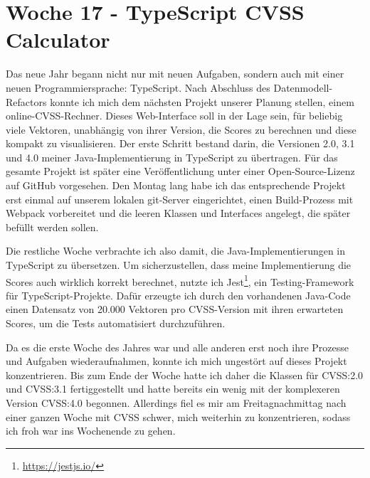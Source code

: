 \section{Woche 17 - TypeScript CVSS Calculator} \label{sec:bericht-wo-17-initial}


\lweekdaymarginpar{\weekdayMondayLong}

Das neue Jahr begann nicht nur mit neuen Aufgaben, sondern auch mit einer neuen Programmiersprache: TypeScript.
Nach Abschluss des Datenmodell-Refactors konnte ich mich dem nächsten Projekt unserer Planung stellen, einem online-CVSS-Rechner.
Dieses Web-Interface soll in der Lage sein, für beliebig viele Vektoren, unabhängig von ihrer Version, die Scores zu berechnen und diese kompakt zu visualisieren.
Der erste Schritt bestand darin, die Versionen 2.0, 3.1 und 4.0 meiner Java-Implementierung in TypeScript zu übertragen.
Für das gesamte Projekt ist später eine Veröffentlichung unter einer Open-Source-Lizenz auf GitHub vorgesehen.
Den Montag lang habe ich das entsprechende Projekt erst einmal auf unserem lokalen git-Server eingerichtet, einen Build-Prozess mit Webpack vorbereitet und die leeren Klassen und Interfaces angelegt, die später befüllt werden sollen.

\sweekdaymarginpar{\weekdayTuesdayShort\ - \weekdayFridayShort}

Die restliche Woche verbrachte ich also damit, die Java-Implementierungen in TypeScript zu übersetzen.
Um sicherzustellen, dass meine Implementierung die Scores auch wirklich korrekt berechnet, nutzte ich Jest\footnote{\url{https://jestjs.io/}}, ein Testing-Framework für TypeScript-Projekte.
Dafür erzeugte ich durch den vorhandenen Java-Code einen Datensatz von 20.000 Vektoren pro CVSS-Version mit ihren erwarteten Scores, um die Tests automatisiert durchzuführen.

Da es die erste Woche des Jahres war und alle anderen erst noch ihre Prozesse und Aufgaben wiederaufnahmen, konnte ich mich ungestört auf dieses Projekt konzentrieren.
Bis zum Ende der Woche hatte ich daher die Klassen für CVSS:2.0 und CVSS:3.1 fertiggestellt und hatte bereits ein wenig mit der komplexeren Version CVSS:4.0 begonnen.
Allerdings fiel es mir am Freitagnachmittag nach einer ganzen Woche mit CVSS schwer, mich weiterhin zu konzentrieren, sodass ich froh war ins Wochenende zu gehen.
